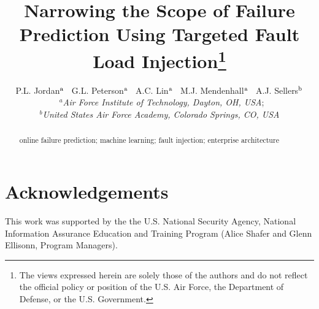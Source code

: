 \documentclass[]{tEIS2e}
\begin{document}

\title{Narrowing the Scope of Failure Prediction Using Targeted Fault Load
Injection\footnote{The views expressed herein are solely those of the authors
and do not reflect the official policy or position of the U.S. Air Force, the
Department of Defense, or the U.S.  Government.}}


\author{P.L. Jordan$^{\rm a}$ \
        G.L. Peterson$^{\rm a}$ \
        A.C. Lin$^{\rm a}$ \
        M.J. Mendenhall$^{\rm a}$ \
        A.J. Sellers$^{\rm b}$ \\\vspace{6pt} \
        $^{a}${\em{Air Force Institute of Technology, Dayton, OH, USA}}; \\
        $^{b}${\em{United States Air Force Academy, Colorado Springs, CO, USA}}}
  
\maketitle

\begin{abstract}


\begin{keywords}
online failure prediction; machine learning; fault injection; enterprise
architecture
\end{keywords}

\clearpage

\end{abstract}


\section*{Acknowledgements}
This work was supported by the the U.S. National Security Agency, National
Information Assurance Education and Training Program (Alice Shafer and Glenn
Ellisonn, Program Managers).


 

\label{lastpage}
\end{document}
